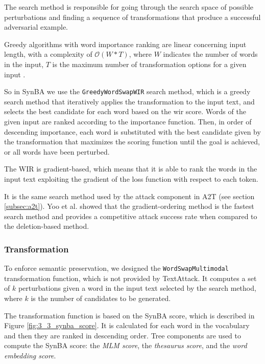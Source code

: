 The search method is responsible for going through the search space of possible perturbations and finding a sequence of transformations that produce a successful adversarial example.

Greedy algorithms with word importance ranking are linear concerning input length, with a complexity of $\mathcal{O}(W*T)$, where $W$ indicates the number of words in the input, $T$ is the maximum number of transformation options for a given input \cite{journals/corr/abs-2009-06368}. 

So in SynBA we use the \texttt{GreedyWordSwapWIR} search method, which is a greedy search method that iteratively applies the transformation to the input text, and selects the best candidate for each word based on the \acrfull{wir} score.
Words of the given input are ranked according to the importance function. Then, in order of descending importance, each word is substituted with the best candidate given by the transformation
that maximizes the scoring function until the goal is achieved, or all words have been perturbed.

The WIR is gradient-based, which means that it is able to rank the words in the input text exploiting the gradient of the loss function with respect to each token.

It is the same search method used by the attack component in A2T (see section \ref{subsec:a2t}).
Yoo et al. \cite{journals/corr/abs-2009-06368} showed that the gradient-ordering method is the fastest search method and provides a competitive attack success rate when compared to the deletion-based method.

\subsubsection{Transformation}\label{subsubsec:transformation}

To enforce semantic preservation, we designed the \texttt{WordSwapMultimodal} transformation function, which is not provided by TextAttack.
It computes a set of $k$ perturbations given a word in the input text selected by the search method, where $k$ is the number of candidates to be generated.

The transformation function is based on the SynBA score, which is described in Figure \ref{fig:3_3_synba_score}.
It is calculated for each word in the vocabulary and then they are ranked in descending order.
Tree components are used to compute the SynBA score: the \emph{MLM score}, the \emph{thesaurus score}, and the \emph{word embedding score}.

